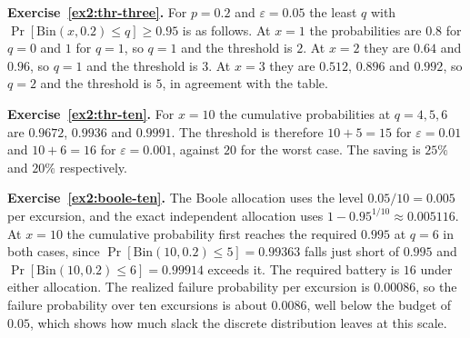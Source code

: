 \textbf{Exercise~\ref{ex2:thr-three}.} For $p=0.2$ and $\varepsilon=0.05$ the least $q$ with $\Pr[\mathrm{Bin}(x,0.2)\le q]\ge0.95$ is as follows. At $x=1$ the probabilities are $0.8$ for $q=0$ and $1$ for $q=1$, so $q=1$ and the threshold is $2$. At $x=2$ they are $0.64$ and $0.96$, so $q=1$ and the threshold is $3$. At $x=3$ they are $0.512$, $0.896$ and $0.992$, so $q=2$ and the threshold is $5$, in agreement with the table.

\textbf{Exercise~\ref{ex2:thr-ten}.} For $x=10$ the cumulative probabilities at $q=4,5,6$ are $0.9672$, $0.9936$ and $0.9991$. The threshold is therefore $10+5=15$ for $\varepsilon=0.01$ and $10+6=16$ for $\varepsilon=0.001$, against $20$ for the worst case. The saving is $25\%$ and $20\%$ respectively.

\textbf{Exercise~\ref{ex2:boole-ten}.} The Boole allocation uses the level $0.05/10=0.005$ per excursion, and the exact independent allocation uses $1-0.95^{1/10}\approx0.005116$. At $x=10$ the cumulative probability first reaches the required $0.995$ at $q=6$ in both cases, since $\Pr[\mathrm{Bin}(10,0.2)\le5]=0.99363$ falls just short of $0.995$ and $\Pr[\mathrm{Bin}(10,0.2)\le6]=0.99914$ exceeds it. The required battery is $16$ under either allocation. The realized failure probability per excursion is $0.00086$, so the failure probability over ten excursions is about $0.0086$, well below the budget of $0.05$, which shows how much slack the discrete distribution leaves at this scale.
